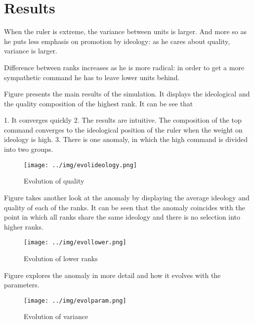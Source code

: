 \section{Results}
\label{sec:results}


When the ruler is extreme, the variance between units is larger. And more so as
he puts less emphasis on promotion by ideology: as he cares about quality,
variance is larger. 

Difference between ranks increases as he is more radical: in order to get a more
sympathetic command he has to leave lower units behind.

Figure presents the main results of the simulation. It displays the ideological
and the quality composition of the highest rank. It can be see that 

1. It converges quickly
2. The results are intuitive. The composition of the top command converges to
the ideological position of the ruler when the weight on ideology is high. 
3. There is one anomaly, in which the high command is divided into two groups. 


\begin{figure}[!h]
  \centering
  \texttt{[image: ../img/evolideology.png]}
  \caption{Evolution of quality}
  \label{fig:evolparam}
\end{figure}

Figure takes another look at the anomaly by displaying the average ideology and
quality of each of the ranks. It can be seen that the anomaly coincides with the
point in which all ranks share the same ideology and there is no selection into
higher ranks. 

\begin{figure}[!h]
  \centering
  \texttt{[image: ../img/evollower.png]}
  \caption{Evolution of lower ranks}
  \label{fig:evolparam}
\end{figure}

Figure explores the anomaly in more detail and how it evolves with the
parameters. 

\begin{figure}[!h]
  \centering
  \texttt{[image: ../img/evolparam.png]}
  \caption{Evolution of variance}
  \label{fig:evolparam}
\end{figure}


